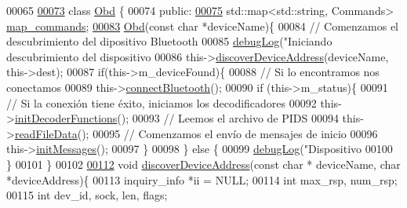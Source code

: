 \begin{DoxyCode}
00065 
\hyperlink{classObd}{00073} \textcolor{keyword}{class }\hyperlink{classObd}{Obd} \{
00074 \textcolor{keyword}{public}:
\hyperlink{classObd_a8300062d1b651d049cf2a2bc916496cd}{00075}     std::map<std::string, Commands> \hyperlink{classObd_a8300062d1b651d049cf2a2bc916496cd}{map\_commands}; 
\hyperlink{classObd_abd8375cee2ad218a9ae8b464d7b1d63f}{00083}     \hyperlink{classObd_abd8375cee2ad218a9ae8b464d7b1d63f}{Obd}(\textcolor{keyword}{const} \textcolor{keywordtype}{char} *deviceName)\{
00084         \textcolor{comment}{// Comenzamos el descubrimiento del dipositivo Bluetooth}
00085         \hyperlink{debug_8hpp_a55f41cf7b0585224496de3d7adbc101c}{debugLog}(\textcolor{stringliteral}{"Iniciando descubrimiento del dispositivo %
00086         this->\hyperlink{classObd_a59676f3fa1fd3052216b55be0a79c474}{discoverDeviceAddress}(deviceName, this->dest);
00087         \textcolor{keywordflow}{if}(this->m\_deviceFound)\{
00088             \textcolor{comment}{// Si lo encontramos nos conectamos}
00089             this->\hyperlink{classObd_a104ccc3f2e0a4a103ae4cd1daa2f64d8}{connectBluetooth}();
00090             \textcolor{keywordflow}{if} (this->m\_status)\{
00091                 \textcolor{comment}{// Si la conexión tiene éxito, iniciamos los decodificadores}
00092                 this->\hyperlink{classObd_a560631b2e3af0a72c063f915a11e0466}{initDecoderFunctions}();
00093                 \textcolor{comment}{// Leemos el archivo de PIDS}
00094                 this->\hyperlink{classObd_a2b8bd75834351a2205d53aec8b3747be}{readFileData}();
00095                 \textcolor{comment}{// Comenzamos el envío de mensajes de inicio}
00096                 this->\hyperlink{classObd_a5091314ed8068800cce40e7a74a3731e}{initMessages}();
00097             \}
00098         \} \textcolor{keywordflow}{else} \{
00099             \hyperlink{debug_8hpp_a55f41cf7b0585224496de3d7adbc101c}{debugLog}(\textcolor{stringliteral}{"Dispositivo %
00100         \}
00101     \}
00102 
\hyperlink{classObd_a59676f3fa1fd3052216b55be0a79c474}{00112}     \textcolor{keywordtype}{void} \hyperlink{classObd_a59676f3fa1fd3052216b55be0a79c474}{discoverDeviceAddress}(\textcolor{keyword}{const} \textcolor{keywordtype}{char} * deviceName, \textcolor{keywordtype}{char} *deviceAddress)\{
00113         inquiry\_info *ii = NULL;
00114         \textcolor{keywordtype}{int} max\_rsp, num\_rsp;
00115         \textcolor{keywordtype}{int} dev\_id, sock, len, flags;
}}
\end{DoxyCode}
